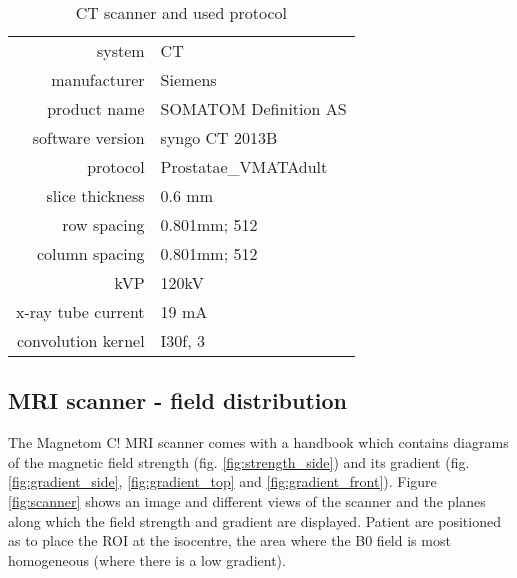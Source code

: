 \begin{table}[!tbh]
\centering
\begin{tabular}{r|l}
system			& CT				\\
manufacturer	& Siemens			\\
product name	& SOMATOM Definition AS		\\
software version& syngo CT 2013B	\\
protocol		& Prostatae\_VMATAdult	\\
slice thickness	& 0.6 mm	\\
row spacing		& 0.801mm; 512	\\
column spacing	& 0.801mm; 512	\\
kVP				& 120kV	\\
x-ray tube current	&	19 mA	\\
convolution kernel	&	I30f, 3
\end{tabular}
\caption{CT scanner and used protocol}
\label{tab:CT-scanner}
\end{table}


\subsection{MRI scanner - field distribution}
\label{sec:magnetom}

The Magnetom C! MRI scanner comes with a handbook which contains diagrams of the magnetic field strength (fig. \ref{fig:strength_side}) and its gradient (fig. \ref{fig:gradient_side}, \ref{fig:gradient_top} and \ref{fig:gradient_front}).
Figure \ref{fig:scanner} shows an image and different views of the scanner and the planes along which the field strength and gradient are displayed.
Patient are positioned as to place the ROI at the isocentre, the area where the B0 field is most homogeneous (where there is a low gradient).

